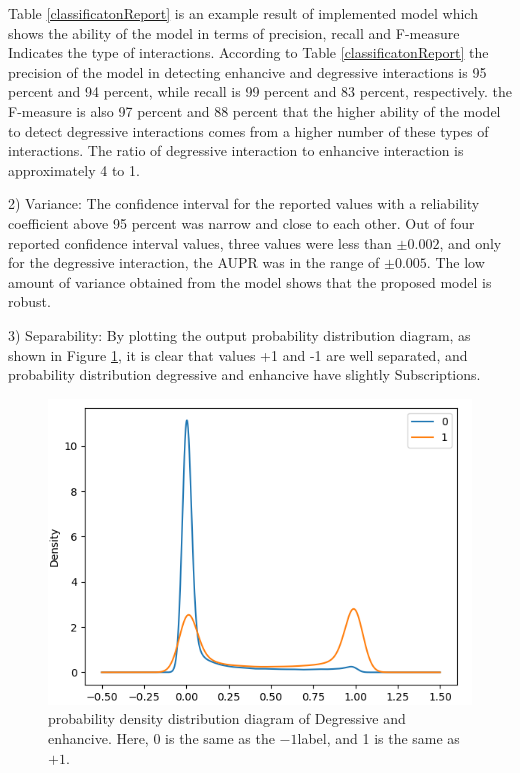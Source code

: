 \documentclass{bmcart}
\begin{document}
Table \ref{classificatonReport} is an example result of implemented model which shows the ability of the model in terms of precision, recall and F-measure Indicates the type of interactions. According to Table \ref{classificatonReport} the precision of the model in detecting enhancive and degressive interactions is 95 percent and 94 percent, while recall is 99 percent and 83 percent, respectively. the F-measure is also 97  percent and 88 percent that the higher ability of the model to detect degressive interactions comes from a higher number of these types of interactions. The ratio of degressive interaction to enhancive interaction is approximately 4 to 1.

2) Variance: The confidence interval for the reported values with a reliability coefficient above 95 percent was narrow and close to each other. Out of four reported confidence interval values, three values were less than $\pm 0.002$, and only for the degressive interaction, the AUPR was in the range of $\pm 0.005$. The low amount of variance obtained from the model shows that the proposed model is robust.

3) Separability: By plotting the output probability distribution diagram, as shown in Figure \ref{DDIProbHist}, it is clear that values +1 and -1 are well separated, and probability distribution degressive and enhancive have slightly Subscriptions.

\begin{figure}[!h]
	\centering
	\includegraphics[scale=0.5]{ModelSelection/densityDegEnh.png}
	\caption{probability density distribution diagram of Degressive and enhancive. Here, 0 is the same as the $-1$label, and 1 is the same as $+1$.}
	\label{DDIProbHist}
\end{figure}
\end{document}
